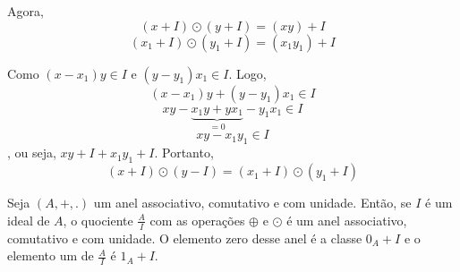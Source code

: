 Agora, \[(x+I)\odot(y+I)=(xy)+I\] \[(x_{1}+I)\odot(y_{1}+I)=(x_{1}y_{1})+I\]

Como $(x-x_{1})y\in I$ e $(y-y_{1})x_{1}\in I$. Logo, \[(x-x_{1})y+(y-y_{1})x_{1}\in I\] \[xy-\underbrace{x_{1}y+yx_{1}}_{=0}-y_{1}x_{1}\in I\]
\[xy-x_{1}y_{1}\in I\], ou seja, $xy+I+x_{1}y_{1}+I$. Portanto, \[(x+I)\odot(y-I)=(x_{1}+I)\odot(y_{1}+I)\]

\begin{teorema} Seja $(A,+,.)$ um anel associativo, comutativo e com unidade. Ent{\~a}o, se $I$ {\'e} um ideal de $A$, o quociente $\displaystyle\frac{A}{I}$ com as opera{\c c}{\~o}es $\oplus$ e $\odot$ {\'e} um anel associativo, comutativo e com unidade. O elemento zero desse anel {\'e} a classe $0_{A}+I$ e o elemento um de $\displaystyle\frac{A}{I}$ {\'e} $1_{A}+I$. \end{teorema}